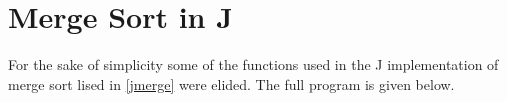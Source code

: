 \chapter{Merge Sort in J}
\label{jmfull}

For the sake of simplicity some of the functions 
used in the J implementation of merge sort lised in \ref{jmerge} were elided.
The full program is given below.

\begin{singlespacing} 
\begin{small}
\end{small}
\end{singlespacing}
